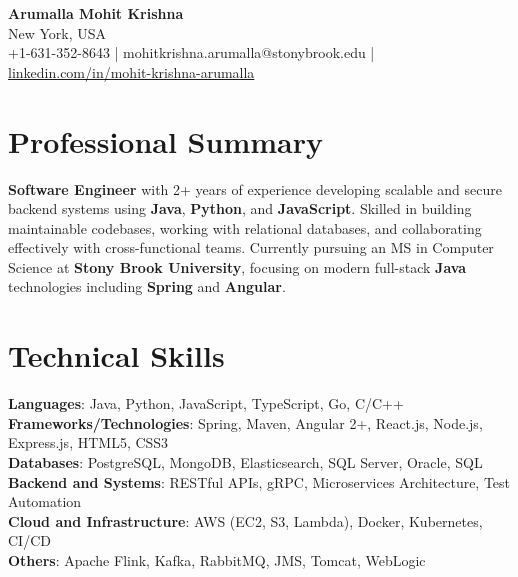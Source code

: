 \documentclass[letterpaper,11pt]{article}
\begin{document}
\begin{center}
  {\Large \textbf{Arumalla Mohit Krishna}} \\
  New York, USA \\
  +1-631-352-8643 \enspace | \enspace mohitkrishna.arumalla@stonybrook.edu \enspace | \enspace \href{https://www.linkedin.com/in/mohit-krishna-arumalla}{linkedin.com/in/mohit-krishna-arumalla}
\end{center}

\section{Professional Summary}
  \begin{itemize}[leftmargin=0.15in, label={}]
    \small{\item{
     \textbf{Software Engineer} with 2+ years of experience developing scalable and secure backend systems using \textbf{Java}, \textbf{Python}, and \textbf{JavaScript}. Skilled in building maintainable codebases, working with relational databases, and collaborating effectively with cross-functional teams. Currently pursuing an MS in Computer Science at \textbf{Stony Brook University}, focusing on modern full-stack \textbf{Java} technologies including \textbf{Spring} and \textbf{Angular}.
    }}
  \end{itemize}
\vspace{-16pt}

\section{Technical Skills}
 \begin{itemize}[leftmargin=0.15in, label={}]
    \small{\item{
     \textbf{Languages}: Java, Python, JavaScript, TypeScript, Go, C/C++ \\
     \textbf{Frameworks/Technologies}: Spring, Maven, Angular 2+, React.js, Node.js, Express.js, HTML5, CSS3 \\
     \textbf{Databases}: PostgreSQL, MongoDB, Elasticsearch, SQL Server, Oracle, SQL \\
     \textbf{Backend and Systems}: RESTful APIs, gRPC, Microservices Architecture, Test Automation \\
     \textbf{Cloud and Infrastructure}: AWS (EC2, S3, Lambda), Docker, Kubernetes, CI/CD \\
     \textbf{Others}: Apache Flink, Kafka, RabbitMQ, JMS, Tomcat, WebLogic
    }}
 \end{itemize}
\vspace{-16pt}
\end{document}
